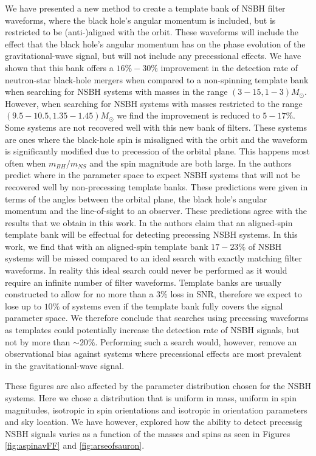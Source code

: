 We have presented a new method to create a template bank of \ac{NSBH} filter
waveforms, where the black hole's angular momentum is
included, but is restricted to be (anti-)aligned with the orbit. These
waveforms will include the effect that the black hole's angular momentum has on
the phase evolution of the gravitational-wave signal, but will not include any
precessional effects. We have shown that this bank offers a
$16\%-30\%$ improvement in the detection rate of neutron-star black-hole
mergers when compared to a non-spinning template bank when searching for 
\ac{NSBH} systems with masses in the range $(3-15,1-3)M_{\odot}$. However, when
searching for \ac{NSBH} systems with masses restricted to the range 
$(9.5-10.5,1.35-1.45)M_{\odot}$ we find the improvement is reduced to $5-17\%$.
Some systems are not recovered well with this new bank of filters. These systems
are ones where the black-hole spin is misaligned with the orbit and the waveform
is significantly modified due to precession of the orbital plane. This happens
most often when $m_{BH} / m_{NS}$ and the spin magnitude are both large. In
\cite{Brown:2012gs} the authors predict where in the parameter space to expect
\ac{NSBH} systems that will not be recovered well by non-precessing template
banks. These predictions were
given in terms of the angles between the orbital plane, the black hole's angular
momentum and the line-of-sight to an observer. These predictions agree with the
results that we obtain in this work. In \cite{Ajith:2012mn} the authors claim
that an aligned-spin template bank will be effectual for detecting precessing
\ac{NSBH} systems. In this work, we find that with an aligned-spin template
bank $17-23\%$ of \ac{NSBH} systems will be missed compared to an ideal search
with
exactly matching filter waveforms. In reality this ideal search could never
be performed as it would require an infinite number of filter waveforms.
Template banks are usually constructed to allow for no more than a 3\% loss in
\ac{SNR}, therefore we expect to lose up to $10\%$ of systems even if the
template bank fully covers the signal parameter space. We therefore conclude
that searches using precessing waveforms as templates could potentially
increase the detection rate of \ac{NSBH} signals, but not by more than $\sim
20\%$. Performing such a search would, however, remove an observational bias
against systems where precessional effects are most prevalent in the
gravitational-wave signal.

These figures are also affected by the 
parameter distribution chosen for the \ac{NSBH} systems. Here we chose a 
distribution that is uniform in mass, uniform in spin magnitudes, isotropic in 
spin orientations and isotropic in orientation parameters and sky location. We 
have however, explored how the ability to detect precessig \ac{NSBH} signals 
varies as a function of the masses and spins as seen in Figures 
\ref{fig:aspinavFF} and \ref{fig:arseofsauron}. 

